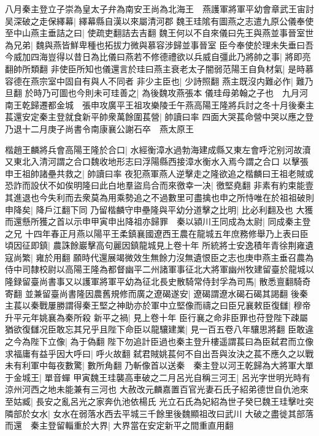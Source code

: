 八月秦主登立子崇為皇太子弁為南安王尚為北海王　燕護軍將軍平幼會章武王宙討吴深破之走保繹幕|{
	繹幕縣自漢以來屬清河郡}
魏王珪隂有圖燕之志遣九原公儀奉使至中山燕主垂詰之曰|{
	使疏吏翻詰去吉翻}
魏王何以不自來儀曰先王與燕並事晉室世為兄弟|{
	魏與燕皆鮮卑種也拓拔力微與慕容涉歸並事晉室}
臣今奉使於理未失垂曰吾今威加四海豈得以昔日為比儀曰燕若不修德禮欲以兵威自彊此乃將帥之事|{
	將即亮翻帥所類翻}
非使臣所知也儀還言於珪曰燕主衰老太子闇弱范陽王自負材氣|{
	是時慕容德在燕宗室中固自有與人不同者}
非少主臣也|{
	少詩照翻}
燕主既沒内難必作|{
	難乃旦翻}
於時乃可圖也今則未可珪善之|{
	為後魏攻燕張本}
儀珪母弟翰之子也　九月河南王乾歸遷都金城　張申攻廣平王祖攻樂陵壬午燕高陽王隆將兵討之冬十月後秦主萇還安定秦主登就食新平帥衆萬餘圍萇營|{
	帥讀曰率}
四面大哭萇命營中哭以應之登乃退十二月庚子尚書令南康襄公謝石卒　燕太原王

楷趙王麟將兵會高陽王隆於合口|{
	水經衡漳水過勃海建成縣又東左會呼沱别河故瀆又東北入清河謂之合口魏收地形志曰浮陽縣西接漳水衡水入焉今謂之合口}
以擊張申王祖帥諸壘共救之|{
	帥讀曰率}
夜犯燕軍燕人逆擊走之隆欲追之楷麟曰王祖老賊或恐詐而設伏不如俟明隆曰此白地羣盜烏合而來徼幸一决|{
	徼堅堯翻}
非素有約束能壹其進退也今失利而去衆莫為用乘勢追之不過數里可盡擒也申之所恃唯在於祖祖破則申降矣|{
	降戶江翻下同}
乃留楷麟守申壘隆與平幼分道擊之比明|{
	比必利翻及也}
大獲而還懸所獲之首以示申甲寅申出降祖亦歸罪　秦以潁川王同成為太尉|{
	同成秦主登之兄}
十四年春正月燕以陽平王柔鎮襄國遼西王農在龍城五年庶務修舉乃上表曰臣頃因征即鎮|{
	農誅餘巖擊高句麗因鎮龍城見上卷十年}
所統將士安逸積年青徐荆雍遺寇尚繁|{
	雍於用翻}
願時代還展竭微效生無餘力沒無遺恨臣之志也庚申燕主垂召農為侍中司隸校尉以高陽王隆為都督幽平二州諸軍事征北大將軍幽州牧建留臺於龍城以隆録留臺尚書事又以護軍將軍平幼為征北長史散騎常侍封孚為司馬|{
	散悉亶翻騎奇寄翻}
並兼留臺尚書隆因農舊規修而廣之遼碣遂安|{
	遼碣謂遼水碣石碣其謁翻}
後秦主萇以秦戰屢勝謂得秦王堅之神助亦於軍中立堅像而禱之曰臣兄襄敕臣復讎|{
	穆帝升平元年姚襄為秦所殺}
新平之禍|{
	見上卷十年}
臣行襄之命非臣罪也苻登陛下疎屬猶欲復讎况臣敢忘其兄乎且陛下命臣以龍驤建業|{
	見一百五卷八年驤思將翻}
臣敢違之今為陛下立像|{
	為于偽翻}
陛下勿追計臣過也秦主登升樓遥謂萇曰為臣弑君而立像求福庸有益乎因大呼曰|{
	呼火故翻}
弑君賊姚萇何不自出吾與汝決之萇不應久之以戰未有利軍中每夜數驚|{
	數所角翻}
乃斬像首以送秦　秦主登以河王乾歸為大將軍大單于金城王|{
	單音蟬}
甲寅魏王珪襲高車破之二月呂光自稱三河王|{
	呂光字世明光時有涼州河西之地未能兼有三河也}
大赦改元麟嘉置百官光妻石氏子紹弟德世自仇池來至姑臧|{
	長安之亂呂光之家奔仇池依楊氏}
光立石氏為妃紹為世子癸巳魏王珪擊吐突隣部於女水|{
	女水在弱落水西去平城三千餘里後魏顯祖改曰武川}
大破之盡徙其部落而還　秦主登留輜重於大界|{
	大界當在安定新平之間重直用翻}
